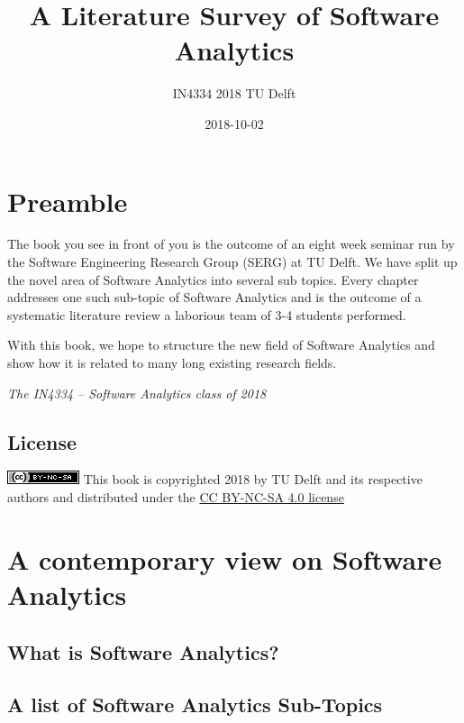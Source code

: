 \documentclass[]{book}
\title{A Literature Survey of Software Analytics}
\author{IN4334 2018 TU Delft}
\date{2018-10-02}
\begin{document}
\maketitle

{
\setcounter{tocdepth}{1}
\tableofcontents
}
\chapter{Preamble}\label{intro}

The book you see in front of you is the outcome of an eight week seminar
run by the Software Engineering Research Group (SERG) at TU Delft. We
have split up the novel area of Software Analytics into several sub
topics. Every chapter addresses one such sub-topic of Software Analytics
and is the outcome of a systematic literature review a laborious team of
3-4 students performed.

With this book, we hope to structure the new field of Software Analytics
and show how it is related to many long existing research fields.

\emph{The IN4334 -- Software Analytics class of 2018}

\section{License}\label{license}

\includegraphics{figures/cc-nc-sa.png} This book is copyrighted 2018 by
TU Delft and its respective authors and distributed under the
\href{https://creativecommons.org/licenses/by-nc-sa/4.0/}{CC BY-NC-SA
4.0 license}

\chapter{A contemporary view on Software
Analytics}\label{a-contemporary-view-on-software-analytics}

\section{What is Software Analytics?}\label{what-is-software-analytics}

\section{A list of Software Analytics
Sub-Topics}\label{a-list-of-software-analytics-sub-topics}
\end{document}
